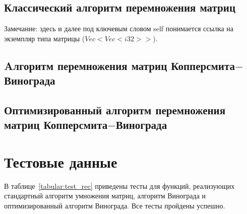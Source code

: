 \subsection{Классический алгоритм перемножения матриц}


Замечание: здесь и далее под ключевым словом self понимается ссылка на экземпляр типа матрицы ($Vec<Vec<i32>>$).
\newpage

\subsection{Aлгоритм перемножения матриц Копперсмита$-$Винограда}




\subsection{Оптимизированный алгоритм перемножения матриц Копперсмита$-$Винограда}



\section{Тестовые данные}

В таблице~\ref{tabular:test_rec} приведены тесты для функций, реализующих стандартный алгоритм умножения матриц, алгоритм Винограда и оптимизированный алгоритм Винограда. Все тесты пройдены успешно.

